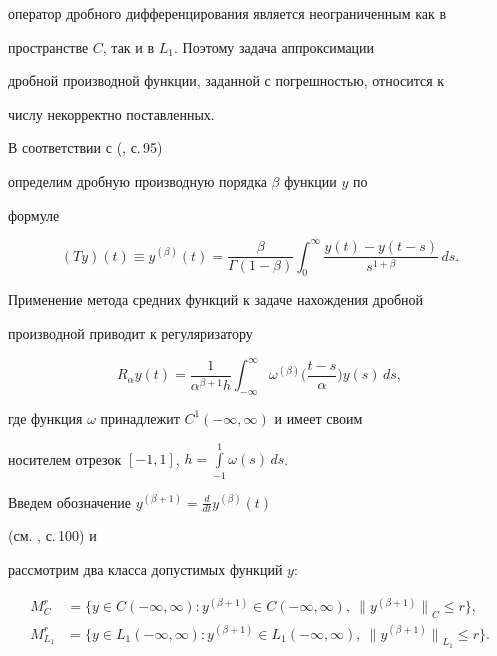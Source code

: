 оператор дробного дифференцирования является неограниченным как в


пространстве $C$, так и в $L_1$. Поэтому задача аппроксимации


дробной производной функции, заданной с погрешностью, относится к


числу некорректно поставленных.





В соответствии с (\cite{fracderiv}, с.\,95)


определим дробную производную порядка $\beta$ функции $y$ по


формуле


$$




(T y)(t)\equiv y^{(\beta)}(t)=\frac{\beta}{\Gamma(1-\beta)}


\int_{0}^{\infty}\frac{y(t)-y(t-s)}{s^{1+\beta}}\,d s.




$$


Применение метода средних функций к задаче нахождения дробной


производной приводит к регуляризатору


$$




R_\alpha


y(t)=\frac{1}{\alpha^{\beta+1}h}\int_{-\infty}^{\infty}


\omega^{(\beta)}\bigg(\frac{t-s}{\alpha}\bigg)y(s)\, d s,




$$


где функция $\omega$ принадлежит $C^1(-\infty,\infty)$ и имеет своим


носителем отрезок $[-1,1]$, $h=\int\limits_{-1}^{1} \omega(s)\,d s$.





Введем обозначение $y^{(\beta+1)}=\frac{d}{d t}y^{(\beta)}(t)$


(см. \cite{fracderiv}, с.\,100) и


рассмотрим два класса допустимых функций $y$:


\begin{align*}


M^r_{C}&=\big\{y\in C(-\infty,\infty): y^{(\beta+1)}


\in C(-\infty,\infty),\ {\|y^{(\beta+1)}\|}_C \leq r\big\},\\


M^r_{L_1}&=\big\{y\in L_1(-\infty,\infty): y^{(\beta+1)}


\in L_1(-\infty,\infty),\ {\|y^{(\beta+1)}\|}_{L_1} \leq r\big\}.


\end{align*}





